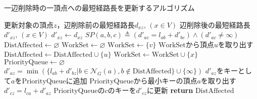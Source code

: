 \begin{algorithm}[H]
  \caption{一辺削除時の一頂点への最短経路長を更新するアルゴリズム}
  \label{algo:update-dist-on-delete}
  \begin{algorithmic}[1]
    \Require 更新対象の頂点$z$，辺削除前の最短経路長$d_{xz},\,(x\in V)$
    \Ensure 辺削除後の最短経路長$d'_{xz},\,(x\in V)$
    \State $d'_{xz}\gets d_{xz}$
    \State $SP(a,b,c)\triangleq(d'_{ac}=l_{ab}+d'_{bc})\land(d'_{ac}\neq\infty)$
    \State $\mathrm{DistAffected}\gets\varnothing$
    \State $\mathrm{WorkSet}\gets\varnothing$
    \Else
    \State $\mathrm{WorkSet}\gets\{v\}$
    \EndIf
    \State $\mathrm{WorkSet}$から頂点$u$を取り出す
    \State $\mathrm{DistAffected}\gets\mathrm{DistAffected}\cup\{u\}$
    \State $\mathrm{WorkSet}\gets\mathrm{WorkSet}\cup\{x\}$
    \EndIf
    \EndFor
    \EndWhile
    \State $\mathrm{PriorityQueue}\gets\varnothing$
    \State $d'_{az}=\min(\{l_{ab}+d'_{bz}|b\in\mathcal{N}_G(a),b\notin\mathrm{DistAffected}\}\cup\{\infty\})$
    \State $d'_{az}$をキーとして$a$を$\mathrm{PriorityQueue}$に追加
    \EndIf
    \EndFor
    \State $\mathrm{PriorityQueue}$から最小キーの頂点$a$を取り出す
    \State $d'_{cz}=l_{ca}+d'_{az}$
    \State $\mathrm{PriorityQueue}$の$c$のキーを$d'_{cz}$に更新
    \EndFor
    \EndWhile
    \State \textbf{return} $\mathrm{DistAffected}$
    \EndProcedure
  \end{algorithmic}
\end{algorithm}

